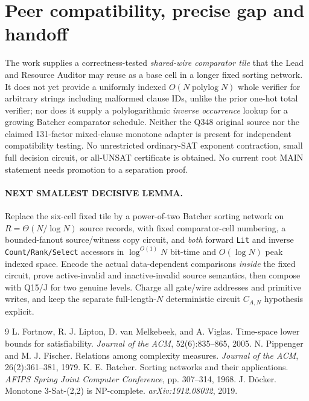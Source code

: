 \documentclass[11pt]{article}
\begin{document}
\section{Peer compatibility, precise gap and handoff}
The work supplies a correctness-tested \emph{shared-wire comparator tile} that the Lead and Resource Auditor may reuse as a base cell in a longer fixed sorting network. It does not yet provide a uniformly indexed $O(N\operatorname{polylog}N)$ whole verifier for arbitrary strings including malformed clause IDs, unlike the prior one-hot total verifier; nor does it supply a polylogarithmic \emph{inverse occurrence} lookup for a growing Batcher comparator schedule. Neither the Q348 original source nor the claimed 131-factor mixed-clause monotone adapter is present for independent compatibility testing. No unrestricted ordinary-SAT exponent contraction, small full decision circuit, or all-UNSAT certificate is obtained. No current root MAIN statement needs promotion to a separation proof.

\paragraph{NEXT SMALLEST DECISIVE LEMMA.} Replace the six-cell fixed tile by a power-of-two Batcher sorting network on $R=\Theta(N/\log N)$ source records, with fixed comparator-cell numbering, a bounded-fanout source/witness copy circuit, and \emph{both} forward \texttt{Lit} and inverse \texttt{Count/Rank/Select} accessors in $\log^{O(1)}N$ bit-time and $O(\log N)$ peak indexed space. Encode the actual data-dependent comparisons \emph{inside} the fixed circuit, prove active-invalid and inactive-invalid source semantics, then compose with Q15/J for two genuine levels. Charge all gate/wire addresses and primitive writes, and keep the separate full-length-$N$ deterministic circuit $C_{A,N}$ hypothesis explicit.

\begin{thebibliography}{9}
 L. Fortnow, R. J. Lipton, D. van Melkebeek, and A. Viglas.
Time-space lower bounds for satisfiability. \emph{Journal of the ACM}, 52(6):835--865, 2005.
 N. Pippenger and M. J. Fischer. Relations among complexity measures.
\emph{Journal of the ACM}, 26(2):361--381, 1979.
 K. E. Batcher. Sorting networks and their applications.
\emph{AFIPS Spring Joint Computer Conference}, pp. 307--314, 1968.
 J. D\"ocker. Monotone 3-Sat-(2,2) is NP-complete.
\emph{arXiv:1912.08032}, 2019.
\end{thebibliography}
\end{document}

